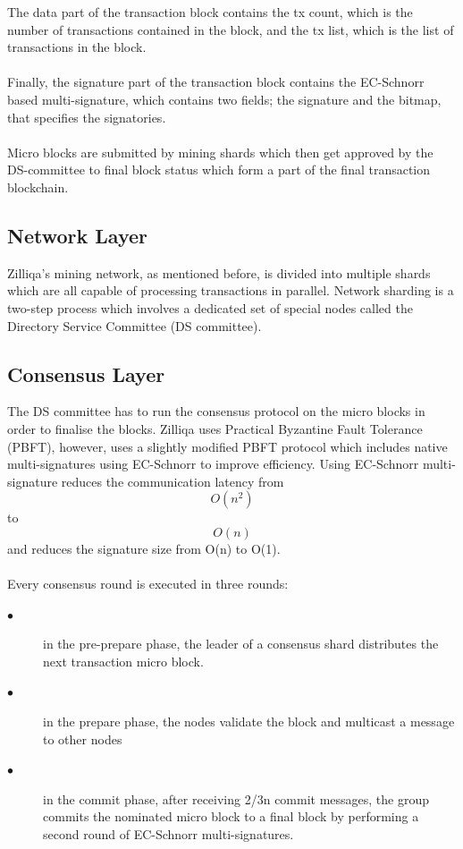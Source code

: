\documentclass[a4paper,twoside,phd]{BYUPhys}
\begin{document}
The data part of the transaction block contains the tx count, which is the number of transactions contained in the block, and the tx list, which is the list of transactions in the block.
\\
\\
Finally, the signature part of the transaction block contains the EC-Schnorr based multi-signature, which contains two fields; the signature and the bitmap, that specifies the signatories.  
\\
\\
Micro blocks are submitted by mining shards which then get approved by the DS-committee to final block status which form a part of the final transaction blockchain.
\subsection{Network Layer}
 Zilliqa's mining network, as mentioned before, is divided into multiple shards which are all capable of processing transactions in parallel. Network sharding is a two-step process which involves a dedicated set of special nodes called the Directory Service Committee (DS committee). 
\subsection{Consensus Layer}
The DS committee has to run the consensus protocol on the micro blocks in order to finalise the blocks. Zilliqa uses Practical Byzantine Fault Tolerance (PBFT), however, uses a slightly modified PBFT protocol which includes native multi-signatures using EC-Schnorr to improve efficiency. Using EC-Schnorr multi-signature reduces the communication latency from \[O(n^2)\] to \[O(n)\] and reduces the signature size from O(n) to O(1).
\\
\\
Every consensus round is executed in three rounds:
\begin{description}
\item[$\bullet$] in the pre-prepare phase, the leader of a consensus shard distributes the next transaction micro block.
\item[$\bullet$] in the prepare phase, the nodes validate the block and multicast a message to other nodes
\item[$\bullet$] in the commit phase, after receiving 2/3n commit messages, the group commits the nominated micro block to a final block by performing a second round of EC-Schnorr multi-signatures.
\end{description}
\end{document}
